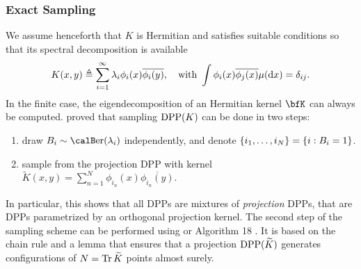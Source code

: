 \documentclass[twoside,11pt]{article}
\begin{document}
    \subsubsection{Exact Sampling} %
    \label{ssub:exact_sampling}

      We assume henceforth that $K$ is Hermitian and satisfies suitable conditions \cite[Theorem 3]{Sos00} so that its spectral decomposition is available
      \begin{equation}
      \label{eq:eigdec_kernel}
        K(x,y)\triangleq\sum\limits_{i=1}^{\infty} \lambda_i \phi_i(x) \overline{\phi_i(y)},
        \quad \text{with }
        \int \phi_i(x) \overline{\phi_j(x)} \mu(\mathop{}\!\mathrm{d} x) = \delta_{ij}.
      \end{equation}
      In the finite case, the eigendecomposition of an Hermitian kernel $\bfK$ can always be computed.
      \noindent\citet[Theorem 7]{HKPV06} proved that sampling $\operatorname{DPP}(K)$ can be done in two steps:
      \begin{enumerate}
        \item draw $B_i\sim\Ber(\lambda_i)$ independently, and denote $\left\{ i_1,\dots,i_{N} \right\} = \left\{ i:B_i=1 \right\}$.
        \item sample from the projection DPP with kernel $\tilde{K}(x,y) = \sum_{n=1}^{N}\phi_{i_n}(x) \overline{\phi_{i_n}(y)}$.
      \end{enumerate}
      In particular, this shows that all DPPs are mixtures of \emph{projection} DPPs, that are DPPs parametrized by an orthogonal projection kernel.
      The second step of the sampling scheme can be performed using \citet[Algorithm 18]{HKPV06} or  Algorithm 18 .
      It is based on the chain rule and a lemma that ensures that a projection $\operatorname{DPP}(\widetilde{K})$ generates configurations of $N=\operatorname{Tr} \widetilde{K}$ points almost surely. 
\end{document}
